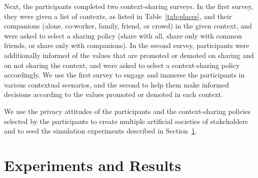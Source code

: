     

 	
    

Next, the participants completed two context-sharing surveys. 
In the first survey, they were given a list of contexts, as listed in Table~\ref{tab:places}, and their companions (alone, co-worker, family, friend, or crowd) in the given context, and were asked to select a sharing policy (share with all, share only with common friends, or share only with companions). In the second survey, participants were additionally informed of the values that are promoted or demoted on sharing and on not sharing the context, and were asked to select a context-sharing policy accordingly. We use the first survey to engage and immerse the participants in various contextual scenarios, and the second to help them make informed decisions according to the values promoted or demoted in each context.

We use the privacy attitudes of the participants and the context-sharing policies selected by the participants to create multiple artificial societies of stakeholders and to seed the simulation experiments described in Section~\ref{sec:results}. 

\section{Experiments and Results}
\label{sec:results}

